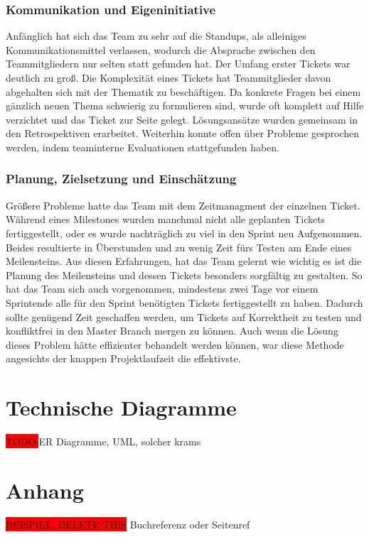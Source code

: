 \documentclass[10pt, a4paper]{article}
\begin{document}
\subsubsection{Kommunikation und Eigeninitiative}
Anfänglich hat sich das Team zu sehr auf die Standups, als alleiniges Kommunikationsmittel verlassen, wodurch die Absprache zwischen den Teammitgliedern nur selten statt gefunden hat.
Der Umfang erster Tickets war deutlich zu groß.
Die Komplexität eines Tickets hat Teammitglieder davon abgehalten sich mit der Thematik zu beschäftigen.
Da konkrete Fragen bei einem gänzlich neuen Thema schwierig zu formulieren sind, wurde oft komplett auf Hilfe verzichtet und das Ticket zur Seite gelegt.
Lösungsansätze wurden gemeinsam in den Retrospektiven erarbeitet.
Weiterhin konnte offen über Probleme gesprochen werden, indem teaminterne Evaluationen stattgefunden haben.

\subsubsection{Planung, Zielsetzung und Einschätzung}
Größere Probleme hatte das Team mit dem Zeitmanagment der einzelnen Ticket.
Während eines Milestones wurden manchmal nicht alle geplanten Tickets fertiggestellt, oder es wurde nachträglich zu viel in den Sprint neu Aufgenommen.
Beides resultierte in Überstunden und zu wenig Zeit fürs Testen am Ende eines Meilensteins.
Aus diesen Erfahrungen, hat das Team gelernt wie wichtig es ist die Planung des Meilensteins und dessen Tickets besonders sorgfältig zu gestalten.
So hat das Team sich auch vorgenommen, mindestens zwei Tage vor einem Sprintende alle für den Sprint benötigten Tickets fertiggestellt zu haben.
Dadurch sollte genügend Zeit geschaffen werden, um Tickets auf Korrektheit zu testen und konfliktfrei in den Master Branch mergen zu können.
Auch wenn die Lösung dieses Problem hätte effizienter behandelt werden können, war diese Methode angesichts der knappen Projektlaufzeit die effektivste.

\section{Technische Diagramme}
\colorbox{red}{TODO:}ER Diagramme, UML, solcher krams

\newpage
\section{Anhang}
\colorbox{red}{BEISPIEL, DELETE THIS} Buchreferenz \cite{Literaturbeispiel:tom} oder Seitenref \cite{google}
\printbibliography
\end{document}
